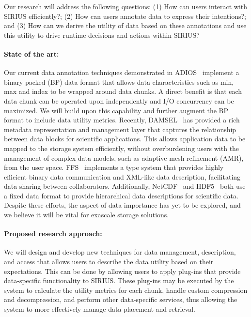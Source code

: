 

Our research will address the following questions:
(1) How can users interact with SIRIUS  efficiently?;
(2) How can users annotate data to express their intentions?; and
(3) How can we derive the utility of data based on these annotations and use this utility to drive runtime decisions and actions within SIRIUS?

\paragraph{State of the art:}
Our current data annotation techniques demonstrated in
ADIOS~\cite{lofstead:2009:adaptible} implement a binary-packed (BP) data format that
allows data characteristics such as min, max and index to be wrapped around
data chunks. A direct benefit is that each data chunk can be operated upon
independently and I/O concurrency can be maximized. We will build upon this
capability and further augment the BP format to include data utility metrics.
Recently,
DAMSEL~\cite{damsel} has provided a rich metadata representation and management
layer that captures the relationship between data blocks for scientific
applications.  This allows application data to be mapped to the storage system
efficiently, without overburdening users with the management of complex data models, such
as adaptive mesh refinement (AMR), from the user space. 
FFS~\cite{ffs} implements a type system that provides highly efficient binary
data communication and XML-like data description, facilitating data sharing
between collaborators. Additionally, NetCDF~\cite{netcdf} and HDF5~\cite{hdf5}
both use a fixed data format to provide hierarchical data descriptions for scientific data.
Despite these efforts, the aspect of data importance has yet to be 
explored, and we believe it will be vital for exascale storage solutions.

\paragraph{Proposed research approach:} 
We will design and develop new techniques for data management, description,
and access that allows users to describe the data utility based on their
expectations. This can be done by allowing users to apply plug-ins that
provide data-specific functionality to SIRIUS.
These plug-ins may be executed by the system to
calculate the utility metrics for each chunk, handle custom compression
and decompression, and perform other data-specific services, thus allowing
the system to more effectively manage data placement and retrieval.
%

